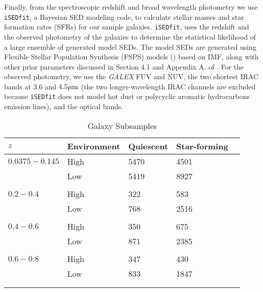 \documentclass{emulateapj}
\begin{document}
Finally, from the spectroscopic redshift and broad wavelength photometry we use \texttt{iSEDfit}, a Bayesian SED modeling code, to calculate stellar masses and star formation rates (SFRs) for our sample galaxies. \texttt{iSEDfit}, uses the redshift and the observed photometry of the galaxies to determine the statistical likelihood of a large ensemble of generated model SEDs. The model SEDs are generated using Flexible Stellar Population Synthesis (FSPS) models (\cite{Conroy:2010aa}) based on \cite{Chabrier:2003aa} IMF, along with other prior parameters discussed in Section 4.1 and Appendix A. of \cite{Moustakas:2013aa}. For the observed photometry, we use the {\em GALEX} FUV and NUV, the two shortest IRAC bands at $3.6$ and $4.5 \mu \rm{m}$ (the two longer-wavelength IRAC channels are excluded because \texttt{iSEDfit} does not model hot dust or polycyclic aromatic hydrocarbons emission lines), and the optical bands. 

\begin{table} %
  \caption{Galaxy Subsamples}
  \label{tab:subsample}
  \begin{center}
    \leavevmode
    \begin{tabular}{lllll} \hline \hline              
    $z$ &Environment        &Quiescent  &Star-forming  \\ \hline 
$0.0375-0.145$ &High           &5470                       &4501                           \\
               &Low            &5419                       &8927                           \\
               &               &                       &                           \\ \hline
$0.2-0.4$      &High           &322                    &583                           \\
               &Low            &768                    &2516                           \\
               &               &                       &                           \\ \hline
$0.4-0.6$      &High           &350                       &675                           \\
               &Low            &871                       &2385                           \\
               &               &                       &                           \\ \hline
$0.6-0.8$      &High           &347                       &430                           \\
               &Low            &833                       &1847                           \\
               &               &                       &                           \\ \hline
  \multicolumn{4}{l}{}                                             \\       
    \end{tabular} 
  \end{center}
\end{table}
\end{document}

